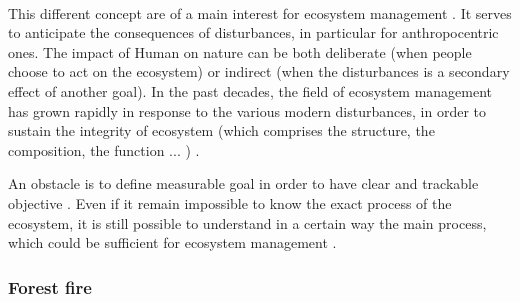 \documentclass{article}
\begin{document}
\paragraph{}

This different concept are of a main interest for ecosystem management \cite{mumby2014ecological}. It serves to anticipate the consequences of disturbances, in particular for anthropocentric ones. The impact of Human on nature can be both deliberate (when people choose to act on the ecosystem) or indirect (when the disturbances is a secondary effect of another goal). In the past decades, the field of ecosystem management has grown rapidly \cite{grumbine1997reflections} in response to the various modern disturbances, in order to sustain the integrity of ecosystem (which comprises the structure, the composition, the function ... ) \cite{jensen1994overview}. 

An obstacle is to define measurable goal in order to have clear and trackable objective \cite{slocombe1998defining}. Even if it remain impossible to know the exact process of the ecosystem, it is still possible to understand in a certain way the main process, which could be sufficient for ecosystem management \cite{mori2011ecosystem}\cite{slocombe1998defining}\cite{stanley1995ecosystem}. 


\subsubsection*{Forest fire}
\end{document}
